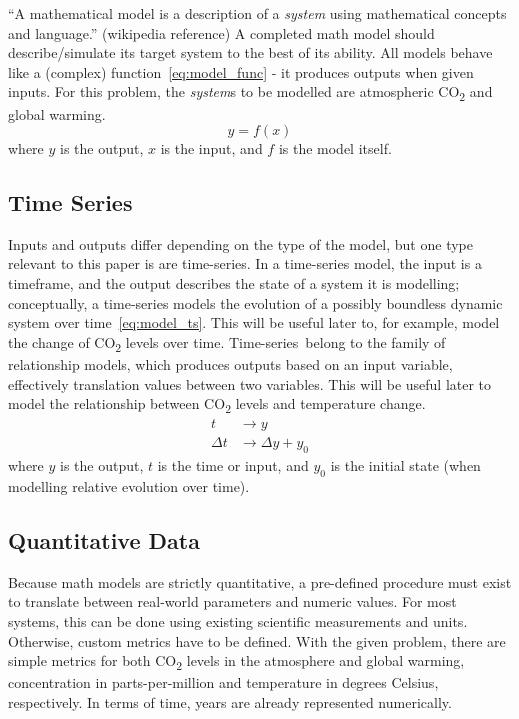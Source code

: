 \documentclass[12pt]{mcmthesis}
\begin{document}
    ``A mathematical model is a description of a \textit{system} using mathematical concepts and language.'' (wikipedia reference) A completed math model should describe/simulate it\textquotesingle s target system to the best of its ability. All models behave like a (complex) function~\eqref{eq:model_func} - it produces outputs when given inputs. For this problem, the \textit{system}s to be modelled are atmospheric CO\textsubscript{2} and global warming.
%
    \begin{equation}
        y = f(x)
        \label{eq:model_func}
    \end{equation}
%
    \noindent where $y$ is the output, $x$ is the input, and $f$ is the model itself.

    \subsection*{Time Series}

    Inputs and outputs differ depending on the type of the model, but one type relevant to this paper is are time-series\textquotesingle . In a time-series model, the input is a timeframe, and the output describes the state of a system it is modelling; conceptually, a time-series models the evolution of a possibly boundless dynamic system over time~\eqref{eq:model_ts}. This will be useful later to, for example, model the change of CO\textsubscript{2} levels over time. Time-series\textquotesingle~belong to the family of relationship models, which produces outputs based on an input variable, effectively translation values between two variables. This will be useful later to model the relationship between CO\textsubscript{2} levels and temperature change.
%
    \begin{equation}
        \begin{aligned}
            t & \rightarrow y \\
            \Delta t & \rightarrow \Delta y + y_0
        \end{aligned}
        \label{eq:model_ts}
    \end{equation}
%
    \noindent where $y$ is the output, $t$ is the time or input, and $y_0$ is the initial state (when modelling relative evolution over time).

    \subsection*{Quantitative Data}

    Because math models are strictly quantitative, a pre-defined procedure must exist to translate between real-world parameters and numeric values. For most systems, this can be done using existing scientific measurements and units. Otherwise, custom metrics have to be defined. With the given problem, there are simple metrics for both CO\textsubscript{2} levels in the atmosphere and global warming, concentration in parts-per-million and temperature in degrees Celsius, respectively. In terms of time, years are already represented numerically.
\end{document}
